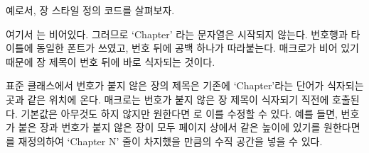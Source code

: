 예로서,  장 스타일 정의 코드를 살펴보자.
\begin{lcode}
\end{lcode}
여기서 \cmd{\printchaptername} 는 비어있다. 그러므로 `Chapter' 라는 문자열은
시작되지 않는다. 번호행과 타이틀에 동일한 폰트가 쓰였고, 번호 뒤에 공백 하나가 따라붙는다.
\cmd{\afterchapternum} 매크로가 비어 있기 때문에 장 제목이 번호 뒤에 바로 식자되는 것이다.


표준 클래스에서 번호가 붙지 않은 장의 제목은 기존에 `Chapter'라는 단어가 식자되는
곳과 같은 위치에 온다.
\cmd{\printchapternonum} 매크로는 번호가 붙지 않은 장 제목이 식자되기 직전에 호출된다.
기본값은 아무것도 하지 않지만 원한다면 \cmd{\renewcommand}로 이를 수정할 수 있다.
예를 들면, 번호가 붙은 장과 번호가 붙지 않은 장이 모두 페이지 상에서 같은 높이에 있기를 원한다면
\cmd{\printchapternonum} 를 재정의하여 `Chapter N' 줄이 차지했을 만큼의
수직 공간을 넣을 수 있다.

